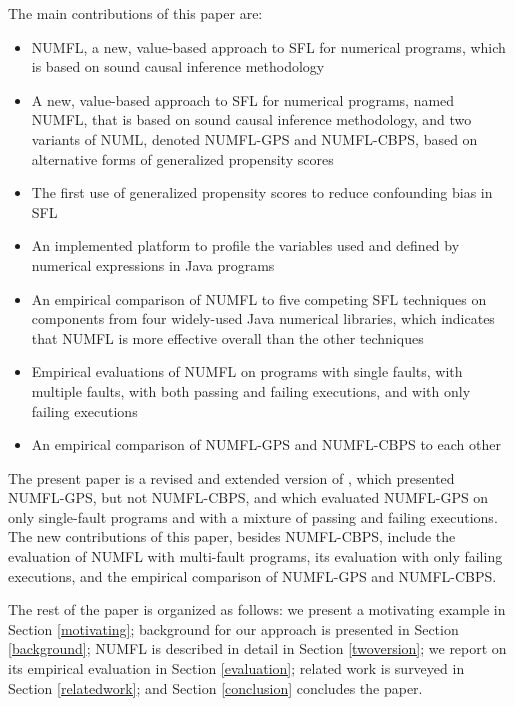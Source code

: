 \documentclass[times]{stvrauth}
\begin{document}
The main contributions of this paper are:
\vspace{-0.2cm}
\begin{itemize}
\item NUMFL, a new, value-based approach to SFL for numerical programs, which is based on sound causal inference methodology
	\item A new, value-based approach to SFL for numerical programs, named NUMFL, that is based on sound causal inference methodology, and two variants of NUML, denoted NUMFL-GPS and NUMFL-CBPS, based on alternative forms of generalized propensity scores
	\item The first use of generalized propensity scores to reduce confounding bias in SFL
	\item An implemented platform to profile the variables used and defined by numerical expressions in Java programs
\item An empirical comparison of NUMFL to five competing SFL techniques on components from four widely-used Java numerical libraries, which indicates that NUMFL is more effective overall than the other techniques
    \item Empirical evaluations of NUMFL on programs with single faults, with multiple faults, with both passing and failing executions, and with only failing executions
\item	An empirical comparison of NUMFL-GPS and NUMFL-CBPS to each other
\end{itemize}

The present paper is a revised and extended version of \cite{Bai2015}, which presented NUMFL-GPS, but not NUMFL-CBPS, and which evaluated NUMFL-GPS on only single-fault programs and with a mixture of passing and failing executions.  The new contributions of this paper, besides NUMFL-CBPS, include the evaluation of NUMFL with multi-fault programs, its evaluation with only failing executions, and the empirical comparison of NUMFL-GPS and NUMFL-CBPS.

The rest of the paper is organized as follows: we present a motivating example in Section \ref{motivating}; background for our approach is presented in Section \ref{background}; NUMFL is described in detail in Section \ref{twoversion};  we report on its empirical evaluation in Section \ref{evaluation}; related work is surveyed in Section \ref{relatedwork}; and Section \ref{conclusion} concludes the paper.




\vspace{-6pt}
\end{document}
